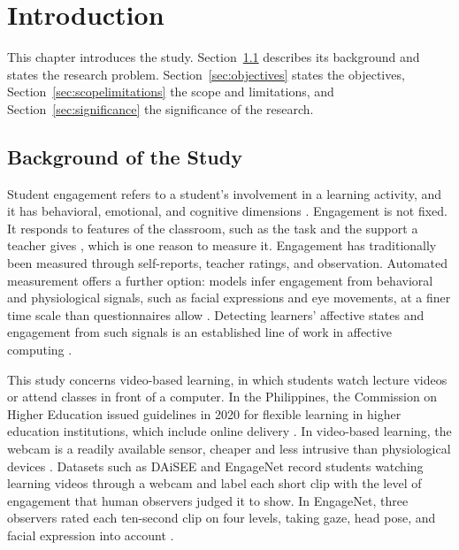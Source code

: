%
%
%

\chapter{Introduction}
\label{sec:intro}

This chapter introduces the study. Section~\ref{sec:overview} describes its background and states the research problem. Section~\ref{sec:objectives} states the objectives, Section~\ref{sec:scopelimitations} the scope and limitations, and Section~\ref{sec:significance} the significance of the research.



\section{Background of the Study}
\label{sec:overview}

Student engagement refers to a student's involvement in a learning activity, and it has behavioral, emotional, and cognitive dimensions \cite{fredricks2004}. Engagement is not fixed. It responds to features of the classroom, such as the task and the support a teacher gives \cite{fredricks2004}, which is one reason to measure it. Engagement has traditionally been measured through self-reports, teacher ratings, and observation. Automated measurement offers a further option: models infer engagement from behavioral and physiological signals, such as facial expressions and eye movements, at a finer time scale than questionnaires allow \cite{dmello2017}. Detecting learners' affective states and engagement from such signals is an established line of work in affective computing \cite{dmello2015}.

This study concerns video-based learning, in which students watch lecture videos or attend classes in front of a computer. In the Philippines, the Commission on Higher Education issued guidelines in 2020 for flexible learning in higher education institutions, which include online delivery \cite{ched2020}. In video-based learning, the webcam is a readily available sensor, cheaper and less intrusive than physiological devices \cite{abedi2021}. Datasets such as DAiSEE \cite{gupta2016} and EngageNet \cite{singh2023} record students watching learning videos through a webcam and label each short clip with the level of engagement that human observers judged it to show. In EngageNet, three observers rated each ten-second clip on four levels, taking gaze, head pose, and facial expression into account \cite{singh2023}.

